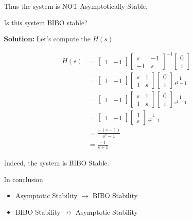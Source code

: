 \documentclass[twoside]{article}
\begin{document}
Thus the system is NOT Asymptotically Stable.

Is this system BIBO stable? 

\textbf{Solution:} Let's compute the $H(s)$

\begin{align*}
  H(s) &= \left[ \begin{array}{cc} 1 & -1 \end{array} \right]
\left[ \begin{array}{cc} s & -1 \\ -1 & s\end{array}
                                                                  \right]^{-1}
\left[ \begin{array}{c} 0 \\ 1 \end{array} \right]
\\
&=
\left[ \begin{array}{cc} 1 & -1 \end{array} \right]
\left[ \begin{array}{cc} s & 1 \\ 1 & s\end{array}
                                                                  \right]
\left[ \begin{array}{c} 0 \\ 1 \end{array} \right] \frac{1}{s^2 - 1}
\\
&=
\left[ \begin{array}{cc} 1 & -1 \end{array} \right]
\left[ \begin{array}{cc} s & 1 \\ 1 & s\end{array}
                                                                  \right]
\left[ \begin{array}{c} 0 \\ 1 \end{array} \right] \frac{1}{s^2 - 1}
\\
&=
\left[ \begin{array}{cc} 1 & -1 \end{array} \right]
\left[ \begin{array}{c} 1 \\ s \end{array} \right] \frac{1}{s^2 - 1}
\\
&= \frac{-(s-1)}{s^2 - 1} 
\\
&= \frac{-1}{s + 1} 
\end{align*}

Indeed, the system is BIBO Stable.

In conclusion

\begin{itemize}
  \item Asymptotic Stability $\rightarrow$ BIBO Stability 
  \item BIBO Stability $\not\rightarrow$ Asymptotic Stability
\end{itemize} 


\end{document}
